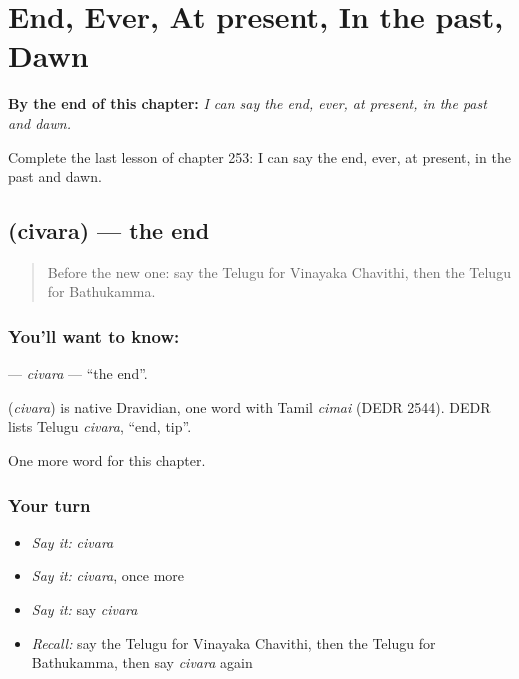 
\chapter{End, Ever, At present, In the past, Dawn}
\label{ch:te-end-ever-at-present-in-the-past-dawn}

\begin{chapteropening}
\textbf{By the end of this chapter:} \emph{I can say the end, ever, at present, in the past and dawn.}

Complete the last lesson of chapter 253: I can say the end, ever, at present, in the past and dawn.
\end{chapteropening}

\section[\texorpdfstring{\te{చివర} (civara)}{చివర (civara)}]{ (civara) — the end}

\label{lesson:TE-C253-civara}



\begin{quote}
Before the new one: say the Telugu for Vinayaka Chavithi, then the Telugu for Bathukamma.
\end{quote}

\subsection*{You'll want to know: }
\textbf{} — \emph{civara} — \textquotedblleft{}the end\textquotedblright{}.

\begin{cousinweb}
\textbf{} (\emph{civara}) is native Dravidian, one word with Tamil \emph{cimai} (DEDR 2544). DEDR lists Telugu \emph{civara}, \textquotedblleft{}end, tip\textquotedblright{}.
\end{cousinweb}

\begin{grammarlens}[title={What you've built}]
One more word for this chapter.
\end{grammarlens}

\subsection*{Your turn}
\begin{itemize}
\raggedright
  \item \emph{Say it:} \emph{civara}
  \item \emph{Say it:} \emph{civara}, once more
  \item \emph{Say it:} say \emph{civara}
  \item \emph{Recall:} say the Telugu for Vinayaka Chavithi, then the Telugu for Bathukamma, then say \emph{civara} again
\end{itemize}

